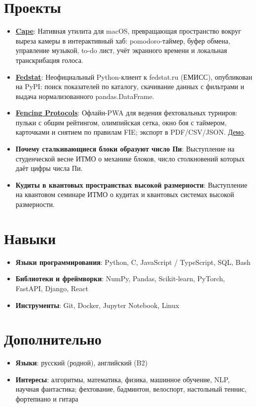 \documentclass[a4paper,11pt]{article}
\newcommand{\resumeItem}[2]{
  \item\small{
    \textbf{#1}{: #2 \vspace{-2pt}}
  }
}
\newcommand{\resumeSubItem}[2]{\resumeItem{#1}{#2}\vspace{-4pt}}
\newcommand{\resumeSubHeadingListStart}{\begin{itemize}[leftmargin=*]}
\newcommand{\resumeSubHeadingListEnd}{\end{itemize}}
\begin{document}
\section{Проекты}
  \resumeSubHeadingListStart
    \resumeSubItem{\href{https://github.com/timryadovouu/cape}{Cape}}
      {Нативная утилита для macOS, превращающая пространство вокруг выреза камеры в интерактивный хаб: pomodoro-таймер, буфер обмена, управление музыкой, to-do лист, учёт экранного времени и локальная транскрибация голоса.}
    \resumeSubItem{\href{https://github.com/timryadovouu/fedstat}{Fedstat}}
      {Неофициальный Python-клиент к fedstat.ru (ЕМИСС), опубликован на PyPI: поиск показателей по каталогу, скачивание данных с фильтрами и выдача нормализованного pandas.DataFrame.}
    \resumeSubItem{\href{https://github.com/timryadovouu/fencing-app}{Fencing Protocols}}
      {Офлайн-PWA для ведения фехтовальных турниров: пульки с общим рейтингом, олимпийская сетка, окно боя с таймером, карточками и снятием по правилам FIE; экспорт в PDF/CSV/JSON. \href{https://fencing-app.timtrue18.workers.dev/}{Демо}.}
    \resumeSubItem{Почему сталкивающиеся блоки образуют число Пи}
      {Выступление на студенческой весне ИТМО о механике блоков, число столкновений которых даёт цифры числа Пи.}
    \resumeSubItem{Кудиты в квантовых пространствах высокой размерности}
      {Выступление на квантовом семинаре ИТМО о кудитах и квантовых системах высокой размерности.}
  \resumeSubHeadingListEnd


\section{Навыки}
 \resumeSubHeadingListStart
   \item{
     \textbf{Языки программирования}{: Python, C, JavaScript / TypeScript, SQL, Bash}
   }
   \item{
     \textbf{Библиотеки и фреймворки}{: NumPy, Pandas, Scikit-learn, PyTorch, FastAPI, Django, React}
   }
   \item{
     \textbf{Инструменты}{: Git, Docker, Jupyter Notebook, Linux}
   }
 \resumeSubHeadingListEnd


\section{Дополнительно}
 \resumeSubHeadingListStart
   \item{
     \textbf{Языки}{: русский (родной), английский (B2)}
   }
   \item{
     \textbf{Интересы}{: алгоритмы, математика, физика, машинное обучение, NLP, научная фантастика; фехтование, бадминтон, велоспорт, настольный теннис, фортепиано и гитара}
   }
 \resumeSubHeadingListEnd


\end{document}
